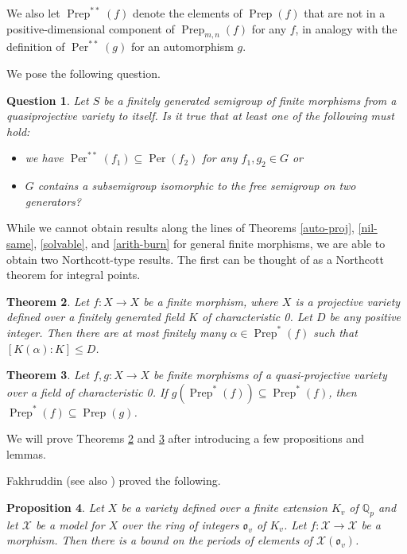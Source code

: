\documentclass{amsart}
\newcommand{\lra}{\longrightarrow}
\newcommand{\bQ}{\mathbb{Q}}
\DeclareMathOperator{\Prep}{Prep}
\DeclareMathOperator{\Per}{Per}
\newcommand{\fo}{\mathfrak o}
\newcommand{\cX}{\mathcal X}
\newtheorem{thm}{Theorem}[section]
\newtheorem{prop}[thm]{Proposition}
\newtheorem{quest}[thm]{Question}
\theoremstyle{definition}
\begin{document}
We also let $\Prep^{**}(f)$ denote the elements of $\Prep(f)$ that are
not in a positive-dimensional component of $\Prep_{m,n}(f)$ for any
$f$, in analogy with the definition of $\Per^{**}(g)$ for an
automorphism $g$.

We pose the following question.

\begin{quest}
Let $S$ be a finitely generated semigroup of finite morphisms from a
quasiprojective variety to itself.  Is it true that at least one of
the following must hold:
\begin{itemize}
\item[(i)] we have $\Per^{**}(f_1) \subseteq \Per(f_2)$ for any $f_1,
  g_2 \in G$ or
\item[(ii)] $G$ contains a subsemigroup isomorphic to the free semigroup on
  two generators?
\end{itemize}
\end{quest}

While we cannot obtain results along the lines of Theorems
\ref{auto-proj}, \ref{nil-same}, \ref{solvable}, and \ref{arith-burn}
for general finite morphisms, we are able to obtain two Northcott-type
results.  The first can be thought of as a Northcott theorem for
integral points.

\begin{thm}\label{north}
  Let $f: X \lra X$ be a finite morphism, where $X$ is a projective variety
  defined over a finitely generated field $K$ of characteristic 0.
  Let $D$ be any positive integer.  Then there are at most finitely
  many $\alpha \in \Prep^*(f)$ such that $[K(\alpha): K] \leq D$.
\end{thm}

\begin{thm}\label{contain}
  Let $f, g: X \lra X$ be finite morphisms of a quasi-projective
  variety over a field of characteristic 0.  If
  $g(\Prep^*(f)) \subseteq \Prep^*(f)$, then
  $\Prep^*(f) \subseteq \Prep(g)$.

\end{thm}

We will prove Theorems \ref{north} and \ref{contain} after introducing
a few propositions and lemmas. 

Fakhruddin \cite[Proposition 1]{Fak2} (see also
\cite[Theorem 1.2]{Keping2}) proved the following.


\begin{prop} \label{period}
  Let $X$ be a variety defined over a finite extension $K_v$ of
  $\bQ_p$ and let $\cX$ be a model for $X$ over the ring of integers
  $\fo_v$ of $K_v$.  Let $f: \cX \lra \cX$ be a morphism.  Then there
  is a bound on the periods of elements of $\cX(\fo_v)$.
\end{prop}
\end{document}
